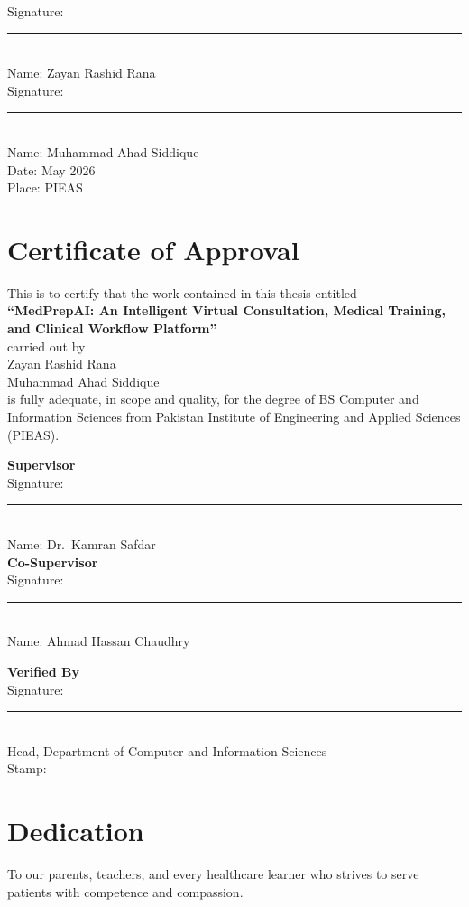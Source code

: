 \vspace{1.5cm}
\begin{flushright}
  Signature:\ \rule{5.5cm}{0.4pt}\\[0.45cm]
  Name: Zayan Rashid Rana\\[0.7cm]
  Signature:\ \rule{5.5cm}{0.4pt}\\[0.45cm]
  Name: Muhammad Ahad Siddique\\[0.9cm]
  Date: May 2026\\[0.35cm]
  Place: PIEAS
\end{flushright}

\chapter*{Certificate of Approval}
This is to certify that the work contained in this thesis entitled\\
\textbf{``MedPrepAI: An Intelligent Virtual Consultation, Medical Training, and Clinical Workflow Platform''}\\
carried out by\\
Zayan Rashid Rana\\
Muhammad Ahad Siddique\\
is fully adequate, in scope and quality, for the degree of BS Computer and Information Sciences from Pakistan Institute of Engineering and Applied Sciences (PIEAS).

\vspace{1.2cm}
\begin{flushright}
  \textbf{Supervisor}\\[0.8cm]
  Signature:\ \rule{5.5cm}{0.4pt}\\[0.5cm]
  Name: Dr.\ Kamran Safdar\\[1.4cm]
  \textbf{Co-Supervisor}\\[0.8cm]
  Signature:\ \rule{5.5cm}{0.4pt}\\[0.5cm]
  Name: Ahmad Hassan Chaudhry
\end{flushright}
\vspace{1.4cm}
\begin{flushleft}
  \textbf{Verified By}\\[0.8cm]
  Signature:\ \rule{5.5cm}{0.4pt}\\[0.5cm]
  Head, Department of Computer and Information Sciences\\[1.0cm]
  Stamp:
\end{flushleft}

\chapter*{Dedication}
To our parents, teachers, and every healthcare learner who strives to serve patients with competence and compassion.

